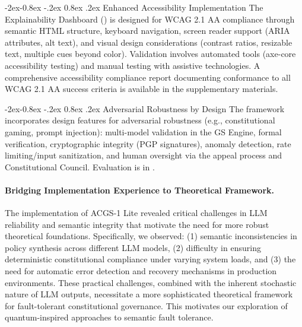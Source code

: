 \documentclass[manuscript,screen,9pt]{acmart}
\makeatletter
\renewcommand\subsubsection{\@startsection{subsubsection}{3}{\z@}%
  {-2ex\@plus -0.8ex \@minus -.2ex}%
  {0.8ex \@plus .2ex}%
  {\normalfont\normalsize\bfseries}}
\makeatother
\begin{document}
\subsubsection{Enhanced Accessibility Implementation}
\label{subsubsec:enhanced_accessibility}
The Explainability Dashboard () is designed for WCAG 2.1 AA compliance through semantic HTML structure, keyboard navigation, screen reader support (ARIA attributes, alt text), and visual design considerations (contrast ratios, resizable text, multiple cues beyond color). Validation involves automated tools (axe-core accessibility testing) and manual testing with assistive technologies. A comprehensive accessibility compliance report documenting conformance to all WCAG 2.1 AA success criteria is available in the supplementary materials.

\subsubsection{Adversarial Robustness by Design}
\label{subsubsec:adversarial_robustness_methods}
The framework incorporates design features for adversarial robustness (e.g., constitutional gaming, prompt injection): multi-model validation in the GS Engine, formal verification, cryptographic integrity (PGP signatures), anomaly detection, rate limiting/input sanitization, and human oversight via the appeal process and Constitutional Council. Evaluation is in .

\paragraph{Bridging Implementation Experience to Theoretical Framework.} The implementation of ACGS-1 Lite revealed critical challenges in LLM reliability and semantic integrity that motivate the need for more robust theoretical foundations. Specifically, we observed: (1) semantic inconsistencies in policy synthesis across different LLM models, (2) difficulty in ensuring deterministic constitutional compliance under varying system loads, and (3) the need for automatic error detection and recovery mechanisms in production environments. These practical challenges, combined with the inherent stochastic nature of LLM outputs, necessitate a more sophisticated theoretical framework for fault-tolerant constitutional governance. This motivates our exploration of quantum-inspired approaches to semantic fault tolerance.
\end{document}
